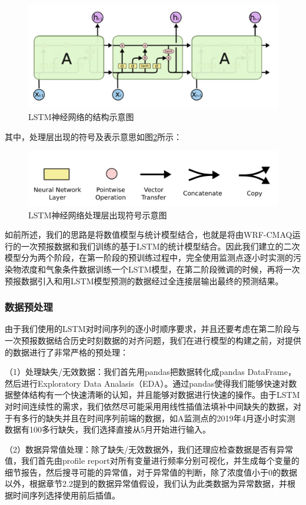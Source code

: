\documentclass[bwprint]{gmcmthesis}
\numberwithin{figure}{section}
\begin{document}
\begin{figure}[!h]
	\centering
	\includegraphics[width=.7\textwidth]{figures//fig3-12.png}
	\caption{LSTM神经网络的结构示意图}
	\label{fig3-12}
\end{figure}

其中，处理层出现的符号及表示意思如图\ref{fig3-13}所示：

\begin{figure}[!h]
	\centering
	\includegraphics[width=.7\textwidth]{figures//fig3-13.png}
	\caption{LSTM神经网络处理层出现符号示意图}
	\label{fig3-13}
\end{figure}

如前所述，我们的思路是将数值模型与统计模型结合，也就是将由WRF-CMAQ运行的一次预报数据和我们训练的基于LSTM的统计模型结合。因此我们建立的二次模型分为两个阶段，在第一阶段的预训练过程中，完全使用监测点逐小时实测的污染物浓度和气象条件数据训练一个LSTM模型，在第二阶段微调的时候，再将一次预报数据引入和用LSTM模型预测的数据经过全连接层输出最终的预测结果。
\subsubsection{数据预处理}
由于我们使用的LSTM对时间序列的逐小时顺序要求，并且还要考虑在第二阶段与一次预报数据结合历史时刻数据的对齐问题，我们在进行模型的构建之前，对提供的数据进行了非常严格的预处理：

（1）处理缺失/无效数据：我们首先用pandas把数据转化成pandas DataFrame，然后进行Exploratory Data Analasis（EDA）。通过pandas使得我们能够快速对数据整体结构有一个快速清晰的认知，并且能够对数据进行快速的操作。由于LSTM对时间连续性的需求，我们依然尽可能采用用线性插值法填补中间缺失的数据，对于有多行的缺失并且在时间序列前端的数据，如A监测点的2019年4月逐小时实测数据有100多行缺失，我们选择直接从5月开始进行输入。

（2）数据异常值处理：除了缺失/无效数据外，我们还理应检查数据是否有异常值，我们首先由profile report对所有变量进行频率分别可视化，并生成每个变量的细节报告，然后搜寻可能的异常值，对于异常值的判断，除了浓度值小于0的数据以外，根据章节2.2提到的数据异常值假设，我们认为此类数据为异常数据，并根据时间序列选择使用前后插值。
\end{document}
